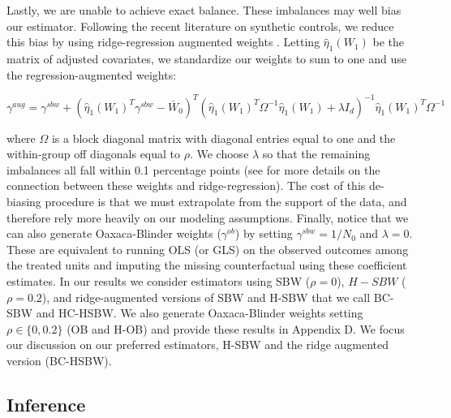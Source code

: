 \documentclass[12pt]{article}
\begin{document}
Lastly, we are unable to achieve exact balance. These imbalances may well bias our estimator. Following the recent literature on synthetic controls, we reduce this bias by using ridge-regression augmented weights \cite{ben2018augmented}. Letting $\hat{\eta}_1(W_1)$ be the matrix of adjusted covariates, we standardize our weights to sum to one and use the regression-augmented weights:

$$
\gamma^{aug} = \gamma^{sbw} + (\hat{\eta}_1(W_1)^T\gamma^{sbw} - \bar{W}_0)^T(\hat{\eta}_1(W_1)^T\Omega^{-1}\hat{\eta}_1(W_1) + \lambda I_d)^{-1}\hat{\eta}_1(W_1)^T\Omega^{-1}
$$

where $\Omega$ is a block diagonal matrix with diagonal entries equal to one and the within-group off diagonals equal to $\rho$. We choose $\lambda$ so that the remaining imbalances all fall within 0.1 percentage points (see \cite{ben2018augmented} for more details on the connection between these weights and ridge-regression). The cost of this de-biasing procedure is that we must extrapolate from the support of the data, and therefore rely more heavily on our modeling assumptions. Finally, notice that we can also generate Oaxaca-Blinder weights ($\gamma^{ob}$) by setting $\gamma^{sbw} = 1/N_0$ and $\lambda = 0$. These are equivalent to running OLS (or GLS) on the observed outcomes among the treated units and imputing the missing counterfactual using these coefficient estimates. In our results we consider estimators using SBW ($\rho = 0$), $H-SBW$ ($\rho = 0.2$), and ridge-augmented versions of SBW and H-SBW that we call BC-SBW and HC-HSBW. We also generate Oaxaca-Blinder weights setting $\rho \in \{0, 0.2\}$ (OB and H-OB) and provide these results in Appendix D. We focus our discussion on our preferred estimators, H-SBW and the ridge augmented version (BC-HSBW).

\subsection{Inference}
\end{document}
